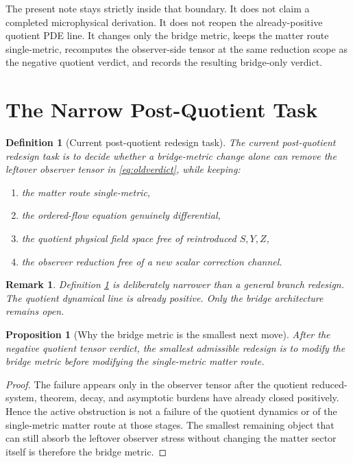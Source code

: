 \documentclass[11pt]{article}
\newtheorem{definition}{Definition}
\newtheorem{proposition}{Proposition}
\newtheorem{remark}{Remark}
\begin{document}
The present note stays strictly inside that boundary. It does not claim a completed microphysical derivation. It does not reopen the already-positive quotient PDE line. It changes only the bridge metric, keeps the matter route single-metric, recomputes the observer-side tensor at the same reduction scope as the negative quotient verdict, and records the resulting bridge-only verdict.

\section{The Narrow Post-Quotient Task}

\begin{definition}[Current post-quotient redesign task]
\label{def:task}
The \emph{current post-quotient redesign task} is to decide whether a bridge-metric change alone can remove the leftover observer tensor in \eqref{eq:oldverdict}, while keeping:
\begin{enumerate}
    \item the matter route single-metric,
    \item the ordered-flow equation genuinely differential,
    \item the quotient physical field space free of reintroduced \(S,Y,Z\),
    \item the observer reduction free of a new scalar correction channel.
\end{enumerate}
\end{definition}

\begin{remark}
Definition \ref{def:task} is deliberately narrower than a general branch redesign. The quotient dynamical line is already positive. Only the bridge architecture remains open.
\end{remark}

\begin{proposition}[Why the bridge metric is the smallest next move]
\label{prop:smallest}
After the negative quotient tensor verdict, the smallest admissible redesign is to modify the bridge metric before modifying the single-metric matter route.
\end{proposition}

\begin{proof}
The failure appears only in the observer tensor after the quotient reduced-system, theorem, decay, and asymptotic burdens have already closed positively. Hence the active obstruction is not a failure of the quotient dynamics or of the single-metric matter route at those stages. The smallest remaining object that can still absorb the leftover observer stress without changing the matter sector itself is therefore the bridge metric.
\end{proof}
\end{document}
